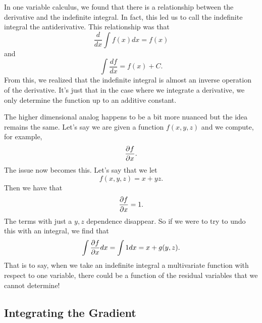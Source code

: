                    	        In one variable calculus, we found that there is a relationship between the derivative and the indefinite integral.  In fact, this led us to call the indefinite integral the antiderivative.  This relationship was that
                   	        \[
                   	        \frac{d}{dx}\int f(x)dx = f(x)
                   	        \]
                   	        and
                   	        \[
                   	        \int \frac{df}{dx} = f(x) + C.
                   	        \]
                   	        From this, we realized that the indefinite integral is almost an inverse operation of the derivative.  It's just that in the case where we integrate a derivative, we only determine the function up to an additive constant. 
                   	        
                   	        
                   	        The higher dimensional analog happens to be a bit more nuanced but the idea remains the same. Let's say we are given a function $f(x,y,z)$ and we compute, for example,
                   	        \[
                   	        \frac{\partial f}{\partial x}.
                   	        \]
                   	        The issue now becomes this.  Let's say that we let
                   	        \[
                   	        f(x,y,z) = x+yz.
                   	        \]
                   	        Then we have that
                   	        \[
                   	        \frac{\partial f}{\partial x} = 1.
                   	        \]
                   	        The terms with just a $y,z$ dependence disappear.  So if we were to try to undo this with an integral, we find that 
                   	        \[
                   	        \int \frac{\partial f}{\partial x} dx = \int 1 dx = x + g(y,z).
                   	        \]
                   	        That is to say, when we take an indefinite integral a multivariate function with respect to one variable, there could be a function of the residual variables that we cannot determine!
                   	        
                   	        \subsection{Integrating the Gradient}
                   	        
